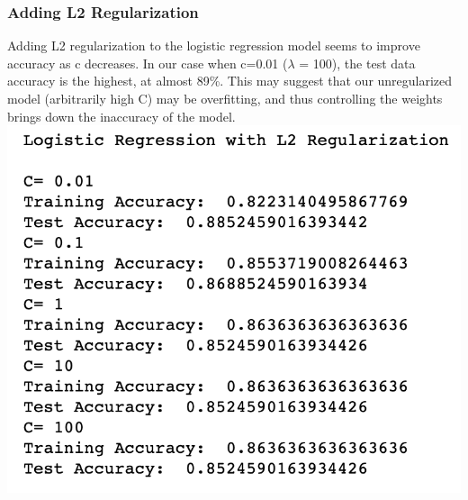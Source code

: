 \documentclass[11pt, oneside]{article}
\begin{document}
\subsubsection *{Adding L2 Regularization}
Adding L2 regularization to the logistic regression model seems to improve accuracy as c decreases. In our case when c=0.01 ($\lambda$ = 100), the test data accuracy is the highest, at almost 89\%. This may suggest that our unregularized model (arbitrarily high C) may be overfitting, and thus controlling the weights brings down the inaccuracy of the model.\\
\includegraphics{2}\\\\
\end{document}
